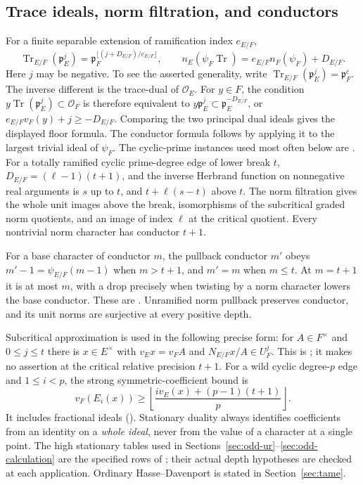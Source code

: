 \documentclass[11pt]{amsart}
\theoremstyle{definition}
\theoremstyle{remark}
\newcommand{\Tr}{\operatorname{Tr}}
\newcommand{\OO}{\mathcal O}\newcommand{\pp}{\mathfrak p}\newcommand{\PP}{\mathfrak P}
\begin{document}
\subsection{Trace ideals, norm filtration, and conductors}
For a finite separable extension of ramification index $e_{E/F}$,
\begin{equation}\label{U:trace-ideal}
 \Tr_{E/F}(\pp_E^j)=\pp_F^{\lfloor(j+D_{E/F})/e_{E/F}\rfloor},
 \qquad n_E(\psi_F\Tr)=e_{E/F}n_F(\psi_F)+D_{E/F}.
\end{equation}
Here $j$ may be negative. To see the asserted generality, write
$\Tr_{E/F}(\pp_E^j)=\pp_F^c$. The inverse different is the trace-dual
of $\OO_E$. For $y\in F$, the condition
$y\Tr(\pp_E^j)\subset\OO_F$ is therefore equivalent to
$y\pp_E^j\subset\pp_E^{-D_{E/F}}$, or
$e_{E/F}v_F(y)+j\ge-D_{E/F}$. Comparing the two principal dual
ideals gives the displayed floor formula. The conductor formula follows
by applying it to the largest trivial ideal of $\psi_F$.
The cyclic-prime instances used most often below are
\cite[Theorem~3.7 and Corollary~3.8]{Ueda}.
For a totally ramified cyclic prime-degree edge of lower break $t$,
$D_{E/F}=(\ell-1)(t+1)$, and the inverse Herbrand function on
nonnegative real arguments is $s$ up to $t$, and $t+\ell(s-t)$ above $t$.
The norm filtration \cite[Theorem~3.7]{Ueda} gives the whole unit
images above the break, isomorphisms of the subcritical graded norm
quotients, and an image of index $\ell$ at the critical quotient.
Every nontrivial norm character has conductor $t+1$.


For a base character of conductor $m$, the pullback conductor $m'$ obeys
$m'-1=\psi_{E/F}(m-1)$ when $m>t+1$, and $m'=m$ when $m\le t$.
At $m=t+1$ it is at most $m$, with a drop precisely when twisting by a
norm character lowers the base conductor. These are
\cite[Corollary~3.9 and Proposition~3.10]{Ueda}.
Unramified norm pullback preserves conductor, and its unit norms are
surjective at every positive depth.

Subcritical approximation is used in the following precise form:
for $A\in F^\times$ and $0\le j\le t$ there is $x\in E^\times$ with
$v_E x=v_F A$ and $N_{E/F}x/A\in U_F^j$. This is
\cite[Lemma~6.6]{Ueda}; it makes no assertion
at the critical relative precision $t+1$.
For a wild cyclic degree-$p$ edge and $1\le i<p$, the strong
symmetric-coefficient bound is
\begin{equation}\label{U:symmetric}
 v_F(E_i(x))\ge\left\lfloor
       \frac{i v_E(x)+(p-1)(t+1)}p\right\rfloor.
\end{equation}
It includes fractional ideals (\cite[Lemma~3.4]{Ueda}).
Stationary duality always identifies coefficients from an identity on a
\emph{whole ideal}, never from the value of a character at a single point.
The high stationary tables used in Sections~\ref{sec:odd-ur}--\ref{sec:odd-calculation} are the specified rows of
\cite[Proposition~6.8]{Ueda}; their actual depth hypotheses are
checked at each application. Ordinary Hasse--Davenport is stated in Section~\ref{sec:tame}.
\end{document}

